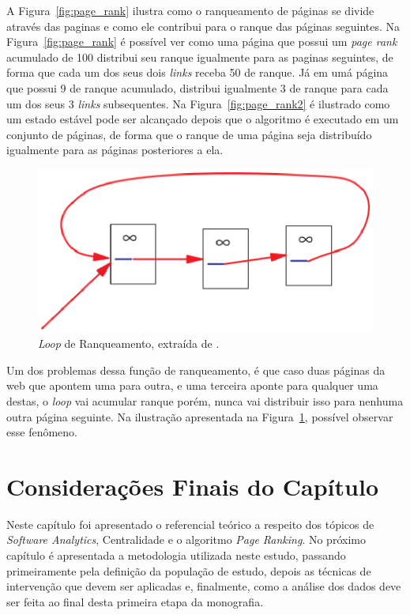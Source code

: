A Figura~\ref{fig:page_rank} ilustra como o ranqueamento de páginas se divide através das paginas e como ele contribui para o ranque das páginas seguintes. Na Figura~\ref{fig:page_rank} é possível ver como uma página que possui um \textit{page rank} acumulado de 100 distribui seu ranque igualmente para as paginas seguintes, de forma que cada um dos seus dois \textit{links} receba 50 de ranque. Já em umá página que possui 9 de ranque acumulado, distribui igualmente 3 de ranque para cada um dos seus 3 \textit{links} subsequentes. Na Figura~\ref{fig:page_rank2} é ilustrado como um estado estável pode ser alcançado depois que o algoritmo é executado em um conjunto de páginas, de forma que o ranque de uma página seja distribuído igualmente para as páginas posteriores a ela. 

\begin{figure}[!h]
    \centering
        \includegraphics[keepaspectratio=true,scale=0.5]{figuras/page_rank3.eps}
    \caption{\textit{Loop} de Ranqueamento, extraída de \protect \cite{pageRank}.}
    \label{fig:page_rank3}
\end{figure}

Um dos problemas dessa função de ranqueamento, é que caso duas páginas da web que apontem uma para outra, e uma terceira aponte para qualquer uma destas, o \textit{loop} vai acumular ranque porém, nunca vai distribuir isso para nenhuma outra página seguinte. Na ilustração apresentada na Figura~\ref{fig:page_rank3}, possível observar esse fenômeno.

\section{Considerações Finais do Capítulo}
Neste capítulo foi apresentado o referencial teórico a respeito dos tópicos de \textit{Software Analytics}, Centralidade e o algoritmo \textit{Page Ranking}. No próximo capítulo é apresentada a metodologia utilizada neste estudo, passando primeiramente pela definição da população de estudo, depois as técnicas de intervenção que devem ser aplicadas e, finalmente, como a análise dos dados deve ser feita ao final desta primeira etapa da monografia.

